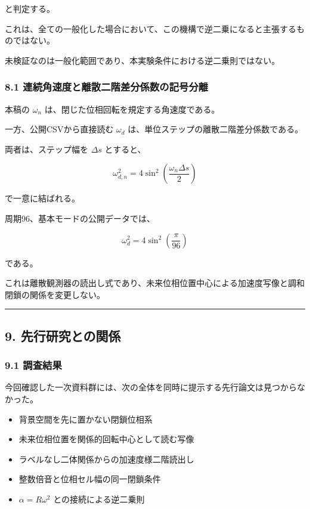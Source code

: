 \documentclass[
  10pt,
  a4paper,
]{ltjsarticle}
\providecommand{\tightlist}{%
  \setlength{\itemsep}{0pt}\setlength{\parskip}{0pt}}
\begin{document}
と判定する。

これは、全ての一般化した場合において、この機構で逆二乗になると主張するものではない。

未検証なのは一般化範囲であり、本実験条件における逆二乗則ではない。

\subsubsection{8.1
連続角速度と離散二階差分係数の記号分離}\label{ux9023ux7d9aux89d2ux901fux5ea6ux3068ux96e2ux6563ux4e8cux968eux5deeux5206ux4fc2ux6570ux306eux8a18ux53f7ux5206ux96e2}

本稿の \(\omega_n\) は、閉じた位相回転を規定する角速度である。

一方、公開CSVから直接読む \(\omega_d\)
は、単位ステップの離散二階差分係数である。

両者は、ステップ幅を \(\Delta s\) とすると、

\[
\omega_{d,n}^2
=4\sin^2\left(\frac{\omega_n\Delta s}{2}\right)
\]

で一意に結ばれる。

周期96、基本モードの公開データでは、

\[
\omega_d^2
=4\sin^2\left(\frac{\pi}{96}\right)
\]

である。

これは離散観測器の読出し式であり、未来位相位置中心による加速度写像と調和閉鎖の関係を変更しない。

\begin{center}\rule{0.5\linewidth}{0.5pt}\end{center}

\subsection{9.
先行研究との関係}\label{ux5148ux884cux7814ux7a76ux3068ux306eux95a2ux4fc2}

\subsubsection{9.1 調査結果}\label{ux8abfux67fbux7d50ux679c}

今回確認した一次資料群には、次の全体を同時に提示する先行論文は見つからなかった。

\begin{itemize}
\tightlist
\item
  背景空間を先に置かない閉鎖位相系
\item
  未来位相位置を関係的回転中心として読む写像
\item
  ラベルなし二体関係からの加速度様二階読出し
\item
  整数倍音と位相セル幅の同一閉鎖条件
\item
  \(\alpha=R\omega^2\) との接続による逆二乗則
\end{itemize}
\end{document}
